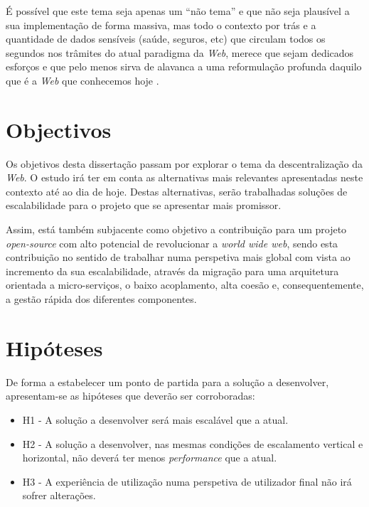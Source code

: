 É possível que este tema seja apenas um “não tema” e que não seja plausível a sua implementação de forma massiva, mas todo o contexto por trás e a quantidade de dados sensíveis (saúde, seguros, etc) que circulam todos os segundos nos trâmites do atual paradigma da \emph{Web},
merece que sejam dedicados esforços e que pelo menos sirva de alavanca a uma reformulação profunda daquilo que é a \emph{Web} que conhecemos hoje \cite{why_web_decentralization_future}.

\section{Objectivos \label{objetivos}}
Os objetivos desta dissertação passam por explorar o tema da descentralização da \emph{Web}. O estudo irá ter em conta as alternativas mais relevantes apresentadas neste contexto até ao dia de hoje. Destas alternativas, serão trabalhadas soluções de escalabilidade para o projeto que se apresentar mais promissor.

Assim, está também subjacente como objetivo a contribuição para um projeto \emph{open-source} com alto potencial de revolucionar a \emph{world wide web}, sendo esta contribuição no sentido de trabalhar numa perspetiva mais global com vista ao incremento da sua escalabilidade, através da migração para uma arquitetura orientada a micro-serviços, o baixo acoplamento, alta coesão e, consequentemente, a gestão rápida dos diferentes componentes.

\section{Hipóteses \label{section_hypothesis}}
De forma a estabelecer um ponto de partida para a solução a desenvolver, apresentam-se as hipóteses que deverão ser corroboradas:
\begin{itemize}
    \item H1 - A solução a desenvolver será mais escalável que a atual.
    \item H2 - A solução a desenvolver, nas mesmas condições de escalamento vertical e horizontal, não deverá ter menos \emph{performance} que a atual.
    \item H3 - A experiência de utilização numa perspetiva de utilizador final não irá sofrer alterações.
\end{itemize}

